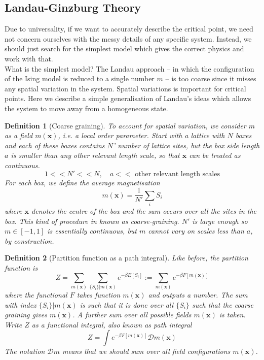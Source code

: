\documentclass[a4paper]{article}
\theoremstyle{new}
\newtheorem{defi}{Definition}[section]
\begin{document}
\subsection{Landau-Ginzburg Theory}
Due to universality, if we want to accurately describe the critical point, we need not concern ourselves with the messy details of any specific system. Instead, we should just search for the simplest model which gives the correct physics and work with that.\\[5pt]
What is the simplest model? The Landau approach – in which the configuration of the Ising model is reduced to a single number $m$ – is too coarse since it misses any spatial variation in the system. Spatial variations is important for critical points. Here we describe a simple generalisation of Landau’s ideas which allows the system to move away from a homogeneous state. 
\begin{defi}[Coarse graining]
To account for spatial variation, we consider $m$ as a field $m(\mathbf{x})$, i.e. a local order parameter. Start with a lattice with $N$ boxes and each of these boxes contains $N$' number of lattice sites, but the box side length $a$ is smaller than any other relevant length scale, so that $\mathbf{x}$ can be treated as continuous.
$$1<<N'<<N,\quad a<<\text{ other relevant length scales}$$
For each box, we define the average magnetisation 
$$m(\mathbf{x})=\frac{1}{N'}\sum_iS_i$$
where $\mathbf{x}$ denotes the centre of the box and the sum occurs over all the sites in the box. This kind of procedure in known as coarse-graining. $N'$ is large enough so $m\in[-1,1]$ is essentially continuous, but $m$ cannot vary on scales less than $a$, by construction.
\end{defi}
\begin{defi}[Partition function as a path integral]
Like before, the partition function is
$$Z=\sum_{m(\mathbf{x})}\sum_{\{S_i\}|m(\mathbf{x})}e^{-\beta E[S_i]}:=\sum_{m(\mathbf{x})}e^{-\beta F[m(\mathbf{x})]}$$
where the functional $F$ takes function $m(\mathbf{x})$ and outputs a number. The sum with index $\{S_i\}|m(\mathbf{x})$ is such that it is done over all $\{S_i\}$ such that the coarse graining gives $m(\mathbf{x})$. A further sum over all possible fields $m(\mathbf{x})$ is taken. Write $Z$ as a functional integral, also known as path integral
$$Z=\int e^{-\beta F[m(\mathbf{x})]}\mathcal{D}m(\mathbf{x})$$
The notation $\mathcal{D}m$ means that we should sum over all field configurations $m(\mathbf{x})$. 
\end{defi}
\end{document}
